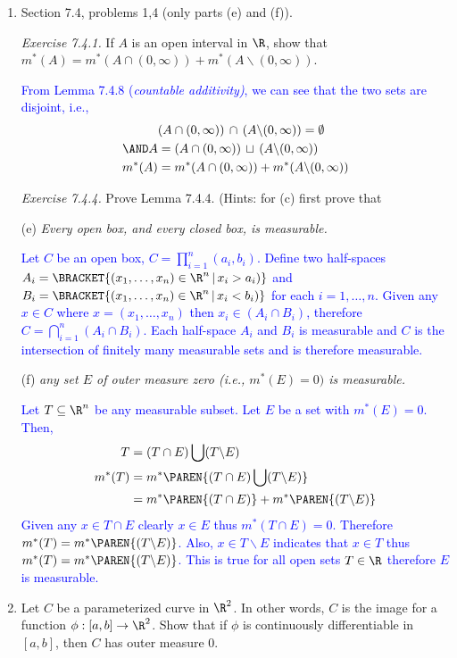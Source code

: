 \documentclass[10pt,a4paper]{report}
\newcommand{\BLUE}[1]{\textcolor{blue}{#1}}
\begin{document}
\begin{enumerate}[label=\Roman*.]
\newpage
\item Section 7.4, problems 1,4 (only parts (e) and (f)).

\textit{Exercise 7.4.1.}  If $A$ is an open interval in $\R$, show that $m^*(A)=m^*(A\cap (0,\infty))+m^*(A\backslash (0,\infty))$.

\BLUE{From Lemma 7.4.8 (\textit{countable additivity)}, we can see that the two sets are disjoint, i.e., 
\begin{align*}
	&(A\cap (0,\infty)) \,\cap\, (A\backslash (0,\infty)) = \emptyset \\
	\AND A &= (A\cap (0,\infty)) \,\sqcup \, (A\backslash (0,\infty)) \\
	m^*(A)&=m^*(A\cap (0,\infty))+m^*(A\backslash (0,\infty))
\end{align*}
}

\textit{Exercise 7.4.4.}  Prove Lemma 7.4.4. (Hints: for (c) first prove that 

(e) \textit{Every open box, and every closed box, is measurable.}

\BLUE{Let $C$ be an open box, $C=\prod_{i=1}^n (a_i, b_i)$.  Define two half-spaces $A_i = \BRACKET{(x_1,\dots,x_n)\in \R^n\,|\, x_i > a_i) }$ and $B_i = \BRACKET{(x_1,\dots,x_n)\in \R^n\,|\, x_i < b_i) }$ for each $i= 1,\dots, n$.  Given any $x\in C$ where $x=(x_1,\dots, x_n)$ then $x_i \in (A_i \cap B_i)$, therefore $C = \bigcap_{i=1}^n (A_i \cap B_i)$.  Each half-space $A_i$ and $B_i$ is measurable and $C$ is the intersection of finitely many measurable sets and is therefore measurable.
}

(f) \textit{any set $E$ of outer measure zero (i.e., $m^*(E) =0)$ is measurable.}

\BLUE{Let $T \subseteq \R^n$ be any measurable subset.  Let $E$ be a set with $m^*(E)=0$.  Then,
\begin{align*}
	T &= (T\cap E) \bigcup (T\backslash E) \\
	m^*(T) &= m^*\PAREN{(T\cap E) \bigcup (T\backslash E)} \\
	&= m^*\PAREN{(T\cap E)} + m^*\PAREN{(T\backslash E)} 
\end{align*}Given any $x \in T\cap E$ clearly $x \in E$ thus $m^*(T\cap E) = 0$.  Therefore $m^*(T) = m^*\PAREN{(T\backslash E)}$.  Also, $x\in T\backslash E$ indicates that $x \in T$ thus $m^*(T) = m^*\PAREN{(T\backslash E)}$.  This is true for all open sets $T \in \R$ therefore $E$ is measurable.
}

\newpage
\item Let $C$ be a parameterized curve in $\R^2$.  In other words, $C$ is the image for a function $\phi:[a,b]\to \R^2$.  Show that if $\phi$ is continuously differentiable in $[a,b]$, then $C$ has outer measure 0.


\end{enumerate}
\end{document}
